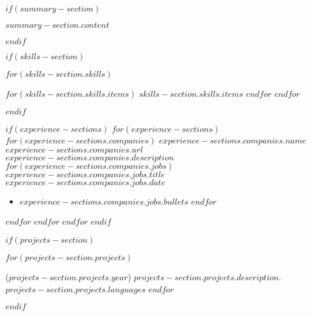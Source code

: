 

\newcommand{\headerinfo}{
    \textbf{\Large $contact.name.first$ $contact.name.last$} \hfill
    $contact.address.county$, $contact.address.state$ \hfill
    ($contact.phone.area_code$) $contact.phone.number$ \hfill
    \href{$contact.email.link$}{$contact.email.address$} \hfill
    \href{$contact.linkedin.url$}{$contact.linkedin.text$} \hfill
    \href{$contact.github.url$}{$contact.github.text$}
}



\thispagestyle{firstpageheaderstyle}

\pagestyle{subsequentpageheaderstyle}

$if(summary-section)$
\begin{justify}
\vspace{-7.5pt}
$summary-section.content$
\end{justify}
$endif$

$if(skills-section)$
\vspace{-15pt}
\begin{description}[align=right,labelwidth=\skillswidth]
\setlength\itemsep{-2pt}
$for(skills-section.skills)$
\item [$skills-section.skills.heading$:]
\commasep{\ensuremath{\cdot}}
$for(skills-section.skills.items)$
$skills-section.skills.items$
$endfor$
\endcommasep
$endfor$
\end{description}
$endif$

$if(experience-sections)$
$for(experience-sections)$
$for(experience-sections.companies)$
\company
{$experience-sections.companies.name$}
{$experience-sections.companies.url$}
{$experience-sections.companies.description$}
$for(experience-sections.companies.jobs)$
\jobtitle
{$experience-sections.companies.jobs.title$}
{$experience-sections.companies.jobs.date$}
\begin{itemize}
\setlength\itemsep{-2pt}
$for(experience-sections.companies.jobs.bullets)$
\item $experience-sections.companies.jobs.bullets$
$endfor$
\end{itemize}
\vspace{-1pt}
$endfor$
$endfor$
\vspace{-4pt}
$endfor$
$endif$

$if(projects-section)$
\vspace{-15pt}
\begin{description}[align=left]
\setlength\itemsep{0pt}
$for(projects-section.projects)$
\item
[$projects-section.projects.name$]
($projects-section.projects.year$)
$projects-section.projects.description$.
$projects-section.projects.languages$
$endfor$
\end{description}
\vspace{-10pt}
$endif$

